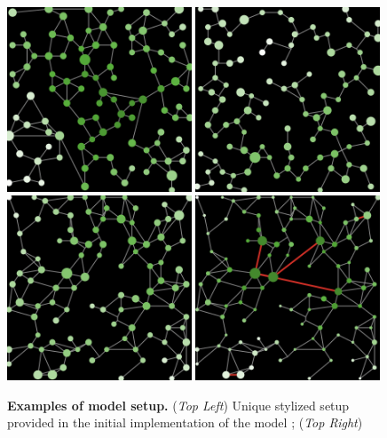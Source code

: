 \begin{figure}
	\centering
	\includegraphics[width=0.49\textwidth]{figures/setup_stylized.png}\hspace{0.1cm}
	\includegraphics[width=0.49\textwidth]{figures/setup_synth_0.png}\\\vspace{0.1cm}
	\includegraphics[width=0.49\textwidth]{figures/setup_synth_1.png}\hspace{0.1cm}
	\includegraphics[width=0.49\textwidth]{figures/setup_synth_1_tick100.png}
	\caption{\textbf{Examples of model setup.} (\textit{Top Left}) Unique stylized setup provided in the initial implementation of the model \cite{schmitt2014modelisation}; (\textit{Top Right})}
\end{figure}
